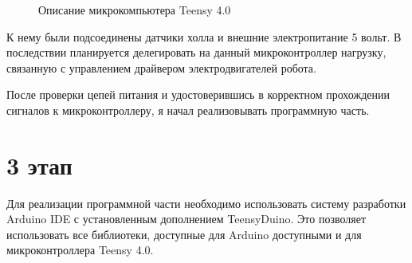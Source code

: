\documentclass[12pt,a4paper]{scrartcl}
\begin{document}
			\begin{figure}[h]
				\caption{Описание микрокомпьютера Teensy 4.0}
				\label{fig:TeensyDesc}
			\end{figure}
			
			К нему были подсоединены датчики холла и внешние электропитание 5 вольт. В последствии планируется делегировать на данный микроконтроллер нагрузку, связанную с управлением драйвером электродвигателей робота.
			
			После проверки цепей питания и удостоверившись в корректном прохождении сигналов к микроконтроллеру, я начал реализовывать программную часть.
			
		\section*{3 этап}
			Для реализации программной части необходимо использовать систему разработки Arduino IDE с установленным дополнением TeensyDuino. Это позволяет использовать все библиотеки, доступные для Arduino доступными и для микроконтроллера Teensy 4.0. 
			
\end{document}
